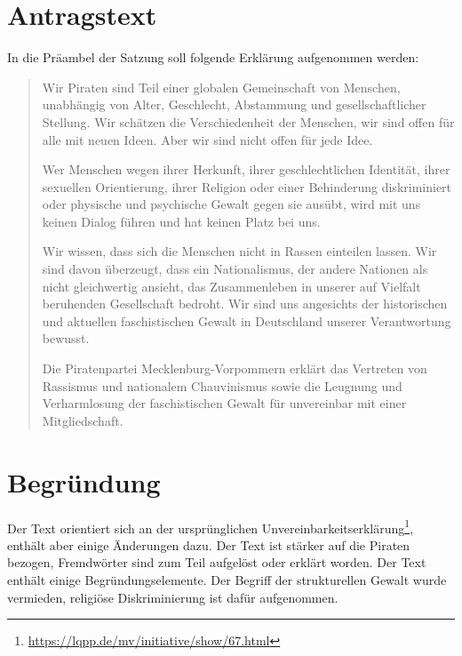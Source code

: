 \section{Antragstext}

In die Präambel der Satzung soll folgende Erklärung aufgenommen werden:

\begin{quote}

Wir Piraten sind Teil einer globalen Gemeinschaft von Menschen, unabhängig von Alter, Geschlecht, Abstammung und gesellschaftlicher Stellung. Wir schätzen die Verschiedenheit der Menschen, wir sind offen für alle mit neuen Ideen. Aber wir sind nicht offen für jede Idee.

Wer Menschen wegen ihrer Herkunft, ihrer geschlechtlichen Identität, ihrer sexuellen Orientierung, ihrer Religion oder einer Behinderung diskriminiert oder physische und psychische Gewalt gegen sie ausübt, wird mit uns keinen Dialog führen und hat keinen Platz bei uns.

Wir wissen, dass sich die Menschen nicht in Rassen einteilen lassen. Wir sind davon überzeugt, dass ein Nationalismus, der andere Nationen als nicht gleichwertig ansieht, das Zusammenleben in unserer auf Vielfalt beruhenden Gesellschaft bedroht. Wir sind uns angesichts der historischen und aktuellen faschistischen Gewalt in Deutschland unserer Verantwortung bewusst.

Die Piratenpartei Mecklenburg-Vorpommern erklärt das Vertreten von Rassismus und nationalem Chauvinismus sowie die Leugnung und Verharmlosung der faschistischen Gewalt für unvereinbar mit einer Mitgliedschaft.

\end{quote}
\section{Begründung}

Der Text orientiert sich an der ursprünglichen Unvereinbarkeitserklärung\footnote{\url{https://lqpp.de/mv/initiative/show/67.html}}, enthält aber einige Änderungen dazu. Der Text ist stärker auf die Piraten bezogen, Fremdwörter sind zum Teil aufgelöst oder erklärt worden. Der Text enthält einige Begründungselemente. Der Begriff der strukturellen Gewalt wurde vermieden, religiöse Diskriminierung ist dafür aufgenommen.
